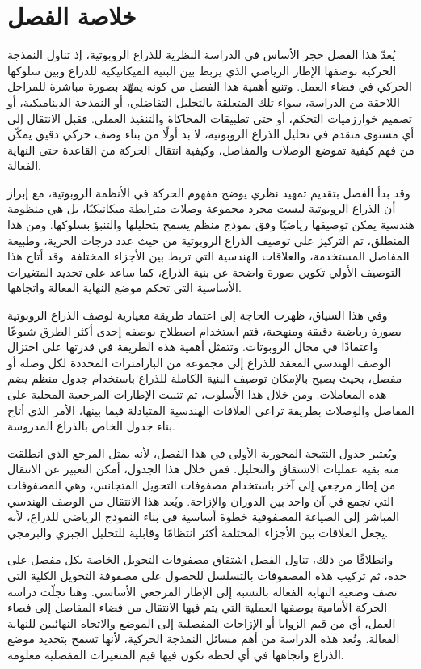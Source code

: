 \section{خلاصة الفصل}

يُعدّ هذا الفصل حجر الأساس في الدراسة النظرية للذراع الروبوتية، إذ تناول النمذجة الحركية بوصفها الإطار الرياضي الذي يربط بين البنية الميكانيكية للذراع وبين سلوكها الحركي في فضاء العمل. وتنبع أهمية هذا الفصل من كونه يمهّد بصورة مباشرة للمراحل اللاحقة من الدراسة، سواء تلك المتعلقة بالتحليل التفاضلي، أو النمذجة الديناميكية، أو تصميم خوارزميات التحكم، أو حتى تطبيقات المحاكاة والتنفيذ العملي. فقبل الانتقال إلى أي مستوى متقدم في تحليل الذراع الروبوتية، لا بد أولًا من بناء وصف حركي دقيق يمكّن من فهم كيفية تموضع الوصلات والمفاصل، وكيفية انتقال الحركة من القاعدة حتى النهاية الفعالة.

وقد بدأ الفصل بتقديم تمهيد نظري يوضح مفهوم الحركة في الأنظمة الروبوتية، مع إبراز أن الذراع الروبوتية ليست مجرد مجموعة وصلات مترابطة ميكانيكيًا، بل هي منظومة هندسية يمكن توصيفها رياضيًا وفق نموذج منظم يسمح بتحليلها والتنبؤ بسلوكها. ومن هذا المنطلق، تم التركيز على توصيف الذراع الروبوتية من حيث عدد درجات الحرية، وطبيعة المفاصل المستخدمة، والعلاقات الهندسية التي تربط بين الأجزاء المختلفة. وقد أتاح هذا التوصيف الأولي تكوين صورة واضحة عن بنية الذراع، كما ساعد على تحديد المتغيرات الأساسية التي تحكم موضع النهاية الفعالة واتجاهها.

وفي هذا السياق، ظهرت الحاجة إلى اعتماد طريقة معيارية لوصف الذراع الروبوتية بصورة رياضية دقيقة ومنهجية، فتم استخدام اصطلاح  بوصفه إحدى أكثر الطرق شيوعًا واعتمادًا في مجال الروبوتات. وتتمثل أهمية هذه الطريقة في قدرتها على اختزال الوصف الهندسي المعقد للذراع إلى مجموعة من البارامترات المحددة لكل وصلة أو مفصل، بحيث يصبح بالإمكان توصيف البنية الكاملة للذراع باستخدام جدول منظم يضم هذه المعاملات. ومن خلال هذا الأسلوب، تم تثبيت الإطارات المرجعية المحلية على المفاصل والوصلات بطريقة تراعي العلاقات الهندسية المتبادلة فيما بينها، الأمر الذي أتاح بناء جدول  الخاص بالذراع المدروسة.

ويُعتبر جدول  النتيجة المحورية الأولى في هذا الفصل، لأنه يمثل المرجع الذي انطلقت منه بقية عمليات الاشتقاق والتحليل. فمن خلال هذا الجدول، أمكن التعبير عن الانتقال من إطار مرجعي إلى آخر باستخدام مصفوفات التحويل المتجانس، وهي المصفوفات التي تجمع في آن واحد بين الدوران والإزاحة. ويُعد هذا الانتقال من الوصف الهندسي المباشر إلى الصياغة المصفوفية خطوة أساسية في بناء النموذج الرياضي للذراع، لأنه يجعل العلاقات بين الأجزاء المختلفة أكثر انتظامًا وقابلية للتحليل الجبري والبرمجي.

وانطلاقًا من ذلك، تناول الفصل اشتقاق مصفوفات التحويل الخاصة بكل مفصل على حدة، ثم تركيب هذه المصفوفات بالتسلسل للحصول على مصفوفة التحويل الكلية التي تصف وضعية النهاية الفعالة بالنسبة إلى الإطار المرجعي الأساسي. وهنا تجلّت دراسة الحركة الأمامية بوصفها العملية التي يتم فيها الانتقال من فضاء المفاصل إلى فضاء العمل، أي من قيم الزوايا أو الإزاحات المفصلية إلى الموضع والاتجاه النهائيين للنهاية الفعالة. وتُعد هذه الدراسة من أهم مسائل النمذجة الحركية، لأنها تسمح بتحديد موضع الذراع واتجاهها في أي لحظة تكون فيها قيم المتغيرات المفصلية معلومة.

